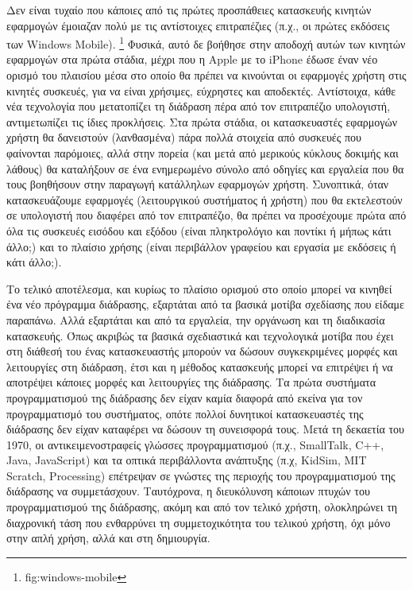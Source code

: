 \documentclass[
]{article}
\begin{document}
Δεν είναι τυχαίο που κάποιες από τις πρώτες προσπάθειες κατασκευής
κινητών εφαρμογών έμοιαζαν πολύ με τις αντίστοιχες επιτραπέζιες (π.χ.,
οι πρώτες εκδόσεις των Windows Mobile). \footnote{fig:windows-mobile}
Φυσικά, αυτό δε βοήθησε στην αποδοχή αυτών των κινητών εφαρμογών στα
πρώτα στάδια, μέχρι που η Apple με το iPhone έδωσε έναν νέο ορισμό του
πλαισίου μέσα στο οποίο θα πρέπει να κινούνται οι εφαρμογές χρήστη στις
κινητές συσκευές, για να είναι χρήσιμες, εύχρηστες και αποδεκτές.
Αντίστοιχα, κάθε νέα τεχνολογία που μετατοπίζει τη διάδραση πέρα από τον
επιτραπέζιο υπολογιστή, αντιμετωπίζει τις ίδιες προκλήσεις. Στα πρώτα
στάδια, οι κατασκευαστές εφαρμογών χρήστη θα δανειστούν (λανθασμένα)
πάρα πολλά στοιχεία από συσκευές που φαίνονται παρόμοιες, αλλά στην
πορεία (και μετά από μερικούς κύκλους δοκιμής και λάθους) θα καταλήξουν
σε ένα ενημερωμένο σύνολο από οδηγίες και εργαλεία που θα τους βοηθήσουν
στην παραγωγή κατάλληλων εφαρμογών χρήστη. Συνοπτικά, όταν
κατασκευάζουμε εφαρμογές (λειτουργικού συστήματος ή χρήστη) που θα
εκτελεστούν σε υπολογιστή που διαφέρει από τον επιτραπέζιο, θα πρέπει να
προσέχουμε πρώτα από όλα τις συσκευές εισόδου και εξόδου (είναι
πληκτρολόγιο και ποντίκι ή μήπως κάτι άλλο;) και το πλαίσιο χρήσης
(είναι περιβάλλον γραφείου και εργασία με εκδόσεις ή κάτι άλλο;).

Το τελικό αποτέλεσμα, και κυρίως το πλαίσιο ορισμού στο οποίο μπορεί να
κινηθεί ένα νέο πρόγραμμα διάδρασης, εξαρτάται από τα βασικά μοτίβα
σχεδίασης που είδαμε παραπάνω. Αλλά εξαρτάται και από τα εργαλεία, την
οργάνωση και τη διαδικασία κατασκευής. Όπως ακριβώς τα βασικά
σχεδιαστικά και τεχνολογικά μοτίβα που έχει στη διάθεσή του ένας
κατασκευαστής μπορούν να δώσουν συγκεκριμένες μορφές και λειτουργίες στη
διάδραση, έτσι και η μέθοδος κατασκευής μπορεί να επιτρέψει ή να
αποτρέψει κάποιες μορφές και λειτουργίες της διάδρασης. Τα πρώτα
συστήματα προγραμματισμού της διάδρασης δεν είχαν καμία διαφορά από
εκείνα για τον προγραμματισμό του συστήματος, οπότε πολλοί δυνητικοί
κατασκευαστές της διάδρασης δεν είχαν καταφέρει να δώσουν τη συνεισφορά
τους. Μετά τη δεκαετία του 1970, οι αντικειμενοστραφείς γλώσσες
προγραμματισμού (π.χ., SmallTalk, C++, Java, JavaScript) και τα οπτικά
περιβάλλοντα ανάπτυξης (π.χ, KidSim, MIT Scratch, Processing) επέτρεψαν
σε γνώστες της περιοχής του προγραμματισμού της διάδρασης να
συμμετάσχουν. Ταυτόχρονα, η διευκόλυνση κάποιων πτυχών του
προγραμματισμού της διάδρασης, ακόμη και από τον τελικό χρήστη,
ολοκληρώνει τη διαχρονική τάση που ενθαρρύνει τη συμμετοχικότητα του
τελικού χρήστη, όχι μόνο στην απλή χρήση, αλλά και στη δημιουργία.
\end{document}
